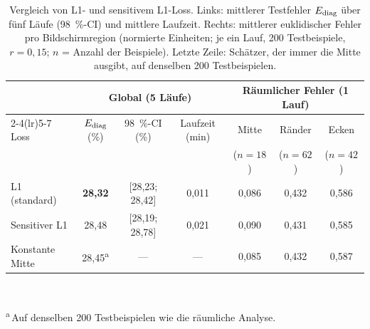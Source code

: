 \begin{table}[htbp]
  \centering
  \caption[Vergleich von L1- und sensitivem L1-Loss]{Vergleich von L1- und sensitivem L1-Loss. Links: mittlerer
           Testfehler $E_{\mathrm{diag}}$ über fünf Läufe (\SI{98}{\percent}-CI) und mittlere Laufzeit. Rechts: mittlerer
           euklidischer Fehler pro Bildschirmregion (normierte Einheiten; je
           ein Lauf, 200 Testbeispiele, $r=0,15$; $n$ = Anzahl der
           Beispiele). Letzte Zeile: Schätzer, der immer die Mitte ausgibt,
           auf denselben 200 Testbeispielen.}
  \label{tab:loss}
  \small
  \setlength{\tabcolsep}{4.5pt}
  \begin{tabular}{lccc@{\hspace{1.2em}}ccc}
    \toprule
    & \multicolumn{3}{c}{Global (5 Läufe)} & \multicolumn{3}{c}{Räumlicher Fehler (1 Lauf)} \\
    \cmidrule(lr){2-4}\cmidrule(lr){5-7}
    Loss & $E_{\mathrm{diag}}$ (\%) & \SI{98}{\percent}-CI (\%) & Laufzeit (min)
            & Mitte & Ränder & Ecken \\
            &               &                           &
            & ($n=18$) & ($n=62$) & ($n=42$) \\
    \midrule
    L1 (standard)\sel{}    & \textbf{28,32} & [28,23; 28,42] & 0,011 & 0,086 & 0,432 & 0,586 \\
    Sensitiver L1          & 28,48 & [28,19; 28,78] & 0,021 & 0,090 & 0,431 & 0,585 \\
    \midrule
    Konstante Mitte        & 28,45\textsuperscript{a} & --- & --- & 0,085 & 0,432 & 0,587 \\
    \bottomrule
  \end{tabular}\\[1mm]
  \parbox{0.95\linewidth}{\footnotesize \textsuperscript{a}\,Auf denselben 200
  Testbeispielen wie die räumliche Analyse.}
\end{table}

